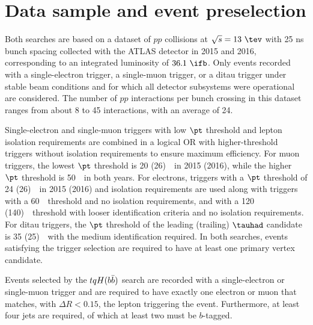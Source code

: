 \section{Data sample and event preselection}
\label{sec:data_presel}

Both searches are based on a dataset of $pp$ collisions at $\sqrt{s}=13~\tev$ with 25 ns bunch spacing collected 
with the ATLAS detector in 2015 and 2016, corresponding to an integrated luminosity of $36.1~\ifb$.
Only events recorded with a single-electron trigger, a single-muon trigger, or a ditau trigger under stable beam conditions 
and for which all detector subsystems were operational are considered.
The number of $pp$ interactions per bunch crossing in this dataset ranges from about 8 to 45 interactions, with an average of 24.

Single-electron and single-muon triggers with low $\pt$ threshold and lepton isolation requirements are combined in a logical OR 
with higher-threshold triggers without isolation requirements to ensure maximum efficiency. 
For muon triggers, the lowest $\pt$ threshold is 20 (26)~\gev\ in 2015 (2016), while the higher $\pt$ threshold is 50~\gev\ in both years. 
For electrons, triggers with a $\pt$ threshold of 24 (26)~\gev\ in 2015 (2016) and isolation requirements are used
along with triggers with a 60~\gev\ threshold and no isolation requirements, and with a 120 (140)~\gev\ threshold 
with looser identification criteria and no isolation requirements.
For ditau triggers, the $\pt$ threshold of the leading (trailing) $\tauhad$ candidate is 35 (25)~\gev\ with the medium identification required.
In both searches, events satisfying the trigger selection are required to have at least one primary vertex candidate.

Events selected by the $tqH(b\bar{b})$ search are recorded with a single-electron or single-muon trigger and 
are required to have exactly one electron or muon that matches, with $\Delta R < 0.15$, the lepton triggering the event.  
Furthermore, at least four jets are required, of which at least two must be $b$-tagged.

